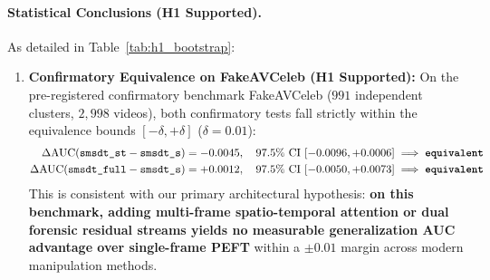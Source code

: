 \paragraph{Statistical Conclusions (H1 Supported).}
As detailed in Table~\ref{tab:h1_bootstrap}:
\begin{enumerate}[leftmargin=*]
    \item \textbf{Confirmatory Equivalence on FakeAVCeleb (H1 Supported):} On the pre-registered confirmatory benchmark FakeAVCeleb ($991$ independent clusters, $2{,}998$ videos), both confirmatory tests fall strictly within the equivalence bounds $[-\delta, +\delta]$ ($\delta=0.01$):
    \begin{align}
    \Delta\text{AUC}(\texttt{smsdt\_st} - \texttt{smsdt\_s}) &= -0.0045, \quad 97.5\%\text{ CI }[-0.0096, +0.0006] \implies \textbf{\texttt{equivalent}} \\
    \Delta\text{AUC}(\texttt{smsdt\_full} - \texttt{smsdt\_s}) &= +0.0012, \quad 97.5\%\text{ CI }[-0.0050, +0.0073] \implies \textbf{\texttt{equivalent}}
    \end{align}
    This is consistent with our primary architectural hypothesis: \textbf{on this benchmark, adding multi-frame spatio-temporal attention or dual forensic residual streams yields no measurable generalization AUC advantage over single-frame PEFT} within a $\pm 0.01$ margin across modern manipulation methods.
    

\end{enumerate}
